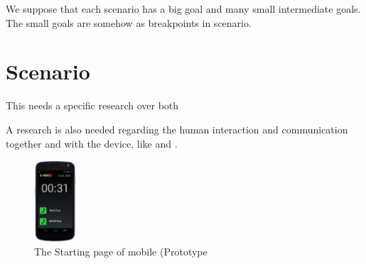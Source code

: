 \documentclass[conference]{IEEEtran}
\begin{document}
We suppose that each scenario has a big goal and many small intermediate goals.
The small goals are somehow as breakpoints in scenario. 


\section{Scenario}
\cite{scenario}

This needs a specific research over both 

A research is also needed regarding the human interaction and communication
together and with the device, like \cite{behavior} and \cite{facial-vocal}.

\cite{scenario-adapt}
\cite{scenario-repurposing}


\cite{scenario-gen}
\cite{l-system}

\begin{figure}
 \centering
\includegraphics[width=0.14\textwidth]{kar}
\caption{The Starting page of mobile (Prototype}
\label{diagram}
\end{figure}




\end{document}
